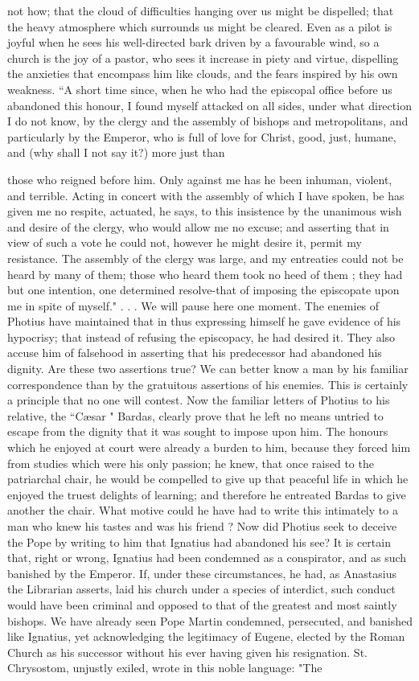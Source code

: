 not how; that the cloud of difficulties hanging over us might be dispelled; that the heavy atmosphere which surrounds us might be cleared. Even as a pilot is joyful when he sees his well-directed bark driven by a favourable wind, so a church is the joy of a pastor, who sees it increase in piety and virtue, dispelling the anxieties that encompass him like clouds, and the fears inspired by his own weakness. “A short time since, when he who had the episcopal office before us abandoned this honour, I found myself attacked on all sides, under what direction I do not know, by the clergy and the assembly of bishops and metropolitans, and particularly by the Emperor, who is full of love for Christ, good, just, humane, and (why shall I not say it?) more just than

those who reigned before him. Only against me has he been inhuman, violent, and terrible. Acting in concert with the assembly of which I have spoken, be has given me no respite, actuated, he says, to this insistence by the unanimous wish and desire of the clergy, who would allow me no excuse; and asserting that in view of such a vote he could not, however he might desire it, permit my resistance. The assembly of the clergy was large, and my entreaties could not be heard by many of them; those who heard them took no heed of them ; they had but one intention, one determined resolve-that of imposing the episcopate upon me in spite of myself." . . . We will pause here one moment. The enemies of Photius have maintained that in thus expressing himself he gave evidence of his hypocrisy; that instead of refusing the episcopacy, he had desired it. They also accuse him of falsehood in asserting that his predecessor had abandoned his dignity. Are these two assertions true? We can better know a man by his familiar correspondence than by the gratuitous assertions of his enemies. This is certainly a principle that no one will contest. Now the familiar letters of Photius to his relative, the “Cæsar " Bardas, clearly prove that he left no means untried to escape from the dignity that it was sought to impose upon him. The honours which he enjoyed at court were already a burden to him, because they forced him from studies which were his only passion; he knew, that once raised to the patriarchal chair, he would be compelled to give up that peaceful life in which he enjoyed the truest delights of learning; and therefore he entreated Bardas to give another the chair. What motive could he have had to write this intimately to a man who knew his tastes and was his friend ? Now did Photius seek to deceive the Pope by writing to him that Ignatius had abandoned his see? It is certain that, right or wrong, Ignatius had been condemned as a conspirator, and as such banished by the Emperor. If, under these circumstances, he had, as Anastasius the Librarian asserts, laid his church under a species of interdict, such conduct would have been criminal and opposed to that of the greatest and most saintly bishops. We have already seen Pope Martin condemned, persecuted, and banished like Ignatius, yet acknowledging the legitimacy of Eugene, elected by the Roman Church as his successor without his ever having given his resignation. St. Chrysostom, unjustly exiled, wrote in this noble language: "The 